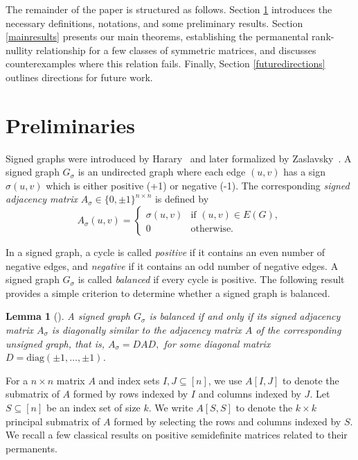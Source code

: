 \documentclass[11pt]{article}
\theoremstyle{plain}
\newtheorem{lemma}[theorem]{Lemma}
\theoremstyle{definition}
\theoremstyle{remark}
\begin{document}
The remainder of the paper is structured as follows. Section \ref{perliminaties} introduces the necessary definitions, notations, and some preliminary results. Section \ref{mainresults} presents our main theorems, establishing the permanental rank-nullity relationship for a few classes of symmetric matrices, and discusses counterexamples where this relation fails. Finally, Section \ref{futuredirections} outlines directions for future work.

 
\section{Preliminaries}\label{perliminaties}

 
Signed graphs were introduced by Harary~\cite{harary1953notion} and later formalized by Zaslavsky~\cite{zaslavsky1982signed}. A signed graph $G_\sigma$ is an undirected graph where each edge $(u, v)$ has a sign $\sigma(u, v)$ which is either positive (+1) or negative (-1). The corresponding \emph{signed adjacency matrix} \( A_\sigma \in \{0,\pm 1\}^{n\times n}
 \) is defined by
\[
A_\sigma(u,v) = 
\begin{cases}
\sigma(u,v) & \text{if } (u,v) \in E(G), \\
0 & \text{otherwise}.
\end{cases}
\]

In a signed graph, a cycle is called \emph{positive} if it contains an even number of negative edges, and \emph{negative} if it contains an odd number of negative edges. A signed graph $G_\sigma$ is called \emph{balanced} if every cycle is positive. The following result provides a simple criterion to determine whether a signed graph is balanced.


\begin{lemma} [\cite{zaslavsky2013matrices}] \label{prop:harary-matrix}
A signed graph \(G_\sigma\) is balanced if and only if its signed adjacency matrix \(A_\sigma\) is diagonally similar to the adjacency matrix \(A\) of the corresponding unsigned graph, that is,
\(
A_\sigma = D A D,
\)
for some diagonal matrix \(D = \mathrm{diag}(\pm1,\ldots,\pm1)\).
\end{lemma}

For a \( n\times n \) matrix \( A \) and index sets \( I,J \subseteq [n] \), we use \( A[I , J] \) to denote the submatrix of \( A \) formed by rows indexed by \( I \) and columns indexed by \( J \).  
Let \( S \subseteq [n] \) be an index set of size \( k \). We write \( A[S,S] \) to denote the \( k \times k \) principal submatrix of \( A \) formed by selecting the rows and columns indexed by \( S \).
We recall a few classical results on positive semidefinite matrices related to their permanents.
\end{document}

